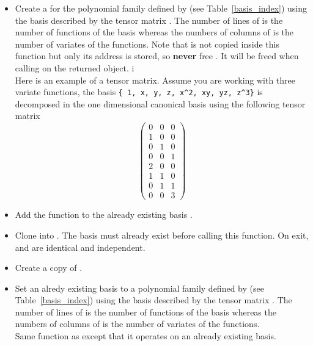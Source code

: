 \begin{itemize}
\item {}
  \sshortdescribe Create a \PnlBasis for the polynomial family
  defined by  (see Table~\ref{basis_index}) using the basis
  described by the tensor matrix . The number of lines of  is
  the number of functions of the basis whereas the numbers of columns of
   is the number of variates of the functions.
  Note that  is not copied inside this function but only its address is
  stored, so {\bf never} free . It will be freed when calling
   on the returned object. i\\
  Here is an example of a tensor matrix. Assume you are working with three
  variate functions, the basis \verb!{ 1, x, y, z, x^2, xy, yz, z^3}! is
  decomposed in the one dimensional canonical basis using the following tensor
  matrix
  \[ \left(
    \begin{array}{ccc}
      0 & 0 & 0 \\
      1 & 0 & 0 \\
      0 & 1 & 0 \\
      0 & 0 & 1 \\
      2 & 0 & 0 \\
      1 & 1 & 0 \\
      0 & 1 & 1\\
      0 & 0 & 3
    \end{array}
  \right) \]

\item {}
  \sshortdescribe Add the function  to the already existing basis .
\item {}
  \sshortdescribe Clone  into . The basis  must
  already exist before calling this function. On exit,  and 
  are identical and independent.
\item {}
  \sshortdescribe Create a copy of .
\item {}
  \sshortdescribe Set an alredy existing basis  to a polynomial family
  defined by  (see Table~\ref{basis_index}) using the basis
  described by the tensor matrix . The number of lines of  is
  the number of functions of the basis whereas the numbers of columns of
   is the number of variates of the functions. \\
  Same function as  except that it
  operates on an already existing basis.


\end{itemize}
